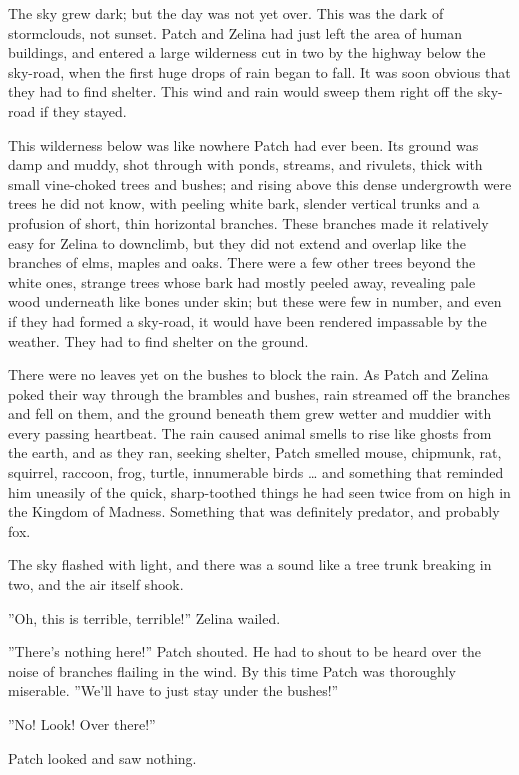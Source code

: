 \documentclass[12pt]{book}
\begin{document}
The sky grew dark; but the day was not yet over. This was the dark of stormclouds, not sunset. Patch and Zelina had just left the area of human buildings, and entered a large wilderness cut in two by the highway below the sky-road, when the first huge drops of rain began to fall. It was soon obvious that they had to find shelter. This wind and rain would sweep them right off the sky-road if they stayed.

This wilderness below was like nowhere Patch had ever been. Its ground was damp and muddy, shot through with ponds, streams, and rivulets, thick with small vine-choked trees and bushes; and rising above this dense undergrowth were trees he did not know, with peeling white bark, slender vertical trunks and a profusion of short, thin horizontal branches. These branches made it relatively easy for Zelina to downclimb, but they did not extend and overlap like the branches of elms, maples and oaks. There were a few other trees beyond the white ones, strange trees whose bark had mostly peeled away, revealing pale wood underneath like bones under skin; but these were few in number, and even if they had formed a sky-road, it would have been rendered impassable by the weather. They had to find shelter on the ground.

There were no leaves yet on the bushes to block the rain. As Patch and Zelina poked their way through the brambles and bushes, rain streamed off the branches and fell on them, and the ground beneath them grew wetter and muddier with every passing heartbeat. The rain caused animal smells to rise like ghosts from the earth, and as they ran, seeking shelter, Patch smelled mouse, chipmunk, rat, squirrel, raccoon, frog, turtle, innumerable birds \ldots{}
and something that reminded him uneasily of the quick, sharp-toothed things he had seen twice from on high in the Kingdom of Madness. Something that was definitely predator, and probably fox.

The sky flashed with light, and there was a sound like a tree trunk breaking in two, and the air itself shook.

''Oh, this is terrible, terrible!'' Zelina wailed.

''There's nothing here!'' Patch shouted. He had to shout to be heard over the noise of branches flailing in the wind. By this time Patch was thoroughly miserable. ''We'll have to just stay under the bushes!''

''No! Look! Over there!''

Patch looked and saw nothing.
\end{document}
